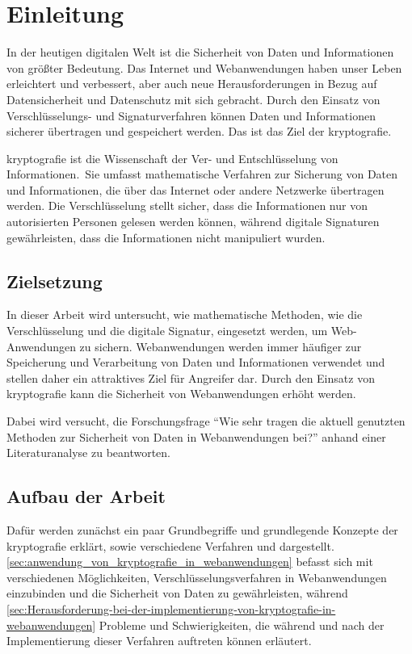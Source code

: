 \section{Einleitung}\label{sec:einleitung}
In der heutigen digitalen Welt ist die Sicherheit von Daten und Informationen von größter Bedeutung.
Das Internet und Webanwendungen haben unser Leben erleichtert und verbessert, aber auch neue Herausforderungen in Bezug auf Datensicherheit und Datenschutz mit sich gebracht.
Durch den Einsatz von Verschlüsselungs- und Signaturverfahren können Daten und Informationen sicherer übertragen und gespeichert werden.
Das ist das Ziel der \gls{kryptografie}.

\gls{kryptografie} ist die Wissenschaft der Ver- und Entschlüsselung von Informationen.\ Sie umfasst mathematische Verfahren zur Sicherung von Daten und Informationen, die über das Internet oder andere Netzwerke übertragen werden.
Die Verschlüsselung stellt sicher, dass die Informationen nur von autorisierten Personen gelesen werden können, während digitale Signaturen gewährleisten, dass die Informationen nicht manipuliert wurden.

\subsection{Zielsetzung}\label{subsec:zielsetzung}
In dieser Arbeit wird untersucht, wie mathematische Methoden, wie die Verschlüsselung und die digitale Signatur, eingesetzt werden, um Web-Anwendungen zu sichern.
Webanwendungen werden immer häufiger zur Speicherung und Verarbeitung von Daten und Informationen verwendet und stellen daher ein attraktives Ziel für Angreifer dar.
Durch den Einsatz von \gls{kryptografie} kann die Sicherheit von Webanwendungen erhöht werden.

Dabei wird versucht, die Forschungsfrage \enquote{Wie sehr tragen die aktuell genutzten  Methoden zur Sicherheit von Daten in Webanwendungen bei?} anhand einer Literaturanalyse zu beantworten.


\subsection{Aufbau der Arbeit}\label{subsec:aufbau-der-arbeit}
Dafür werden zunächst ein paar Grundbegriffe und grundlegende Konzepte der \gls{kryptografie} erklärt, sowie verschiedene  Verfahren und  dargestellt.
\autoref{sec:anwendung_von_kryptografie_in_webanwendungen} befasst sich mit verschiedenen Möglichkeiten, Verschlüsselungsverfahren in Webanwendungen einzubinden und die Sicherheit von Daten zu gewährleisten, während  \autoref{sec:Herausforderung-bei-der-implementierung-von-kryptografie-in-webanwendungen} Probleme und Schwierigkeiten, die während und nach der Implementierung dieser Verfahren auftreten können erläutert.